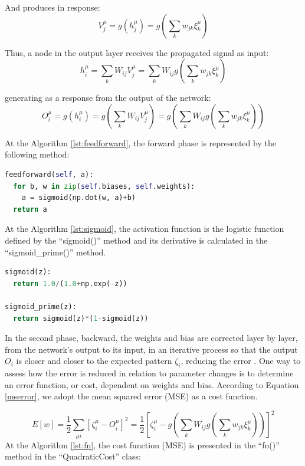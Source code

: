And produces in response:
\begin{equation}
\label{vequal}
V_j^\mu=g(h_j^\mu)=g(\sum_kw_{jk}\xi_k^\mu)
\end{equation}

Thus, a node in the output layer receives the propagated signal as input:
\begin{equation}
\label{sumsums}
h_i^\mu=\sum_kW_{ij}V_j^\mu=\sum_kW_{ij}g(\sum_kw_{jk}\xi_k^\mu)
\end{equation}

generating as a response from the output of the network:
\begin{equation}
\label{outeq}
O_i^\mu=g(h_i^\mu)=g(\sum_kW_{ij}V_j^\mu)=g(\sum_kW_{ij}g(\sum_kw_{jk}\xi_k^\mu))
\end{equation}

At the Algorithm \ref{lst:feedforward}, the forward phase is represented by the following method:

\begin{lstlisting}[caption={Delta method in Python},label={lst:feedforward},language=Python]
feedforward(self, a):
  for b, w in zip(self.biases, self.weights):
    a = sigmoid(np.dot(w, a)+b)
  return a
\end{lstlisting}

At the Algorithm \ref{lst:sigmoid}, the activation function is the logistic function defined by the “sigmoid()” method and its derivative is calculated in the “sigmoid\_prime()” method.

\begin{lstlisting}[caption={Delta method in Python},label={lst:sigmoid},language=Python]
sigmoid(z):
  return 1.0/(1.0+np.exp(-z))
 
sigmoid_prime(z):
  return sigmoid(z)*(1-sigmoid(z))
\end{lstlisting}

In the second phase, backward, the weights and bias are corrected layer by layer, from the network's output to its input, in an iterative process so that the output $O_i$ is closer and closer to the expected pattern $\zeta_i$, reducing the error \cite{haykin1999}. One way to assess how the error is reduced in relation to parameter changes is to determine an error function, or cost, dependent on weights and bias. According to Equation \ref{mserror}, we adopt the mean squared error (MSE) as a cost function.

\begin{equation}
\label{mserror}
E[w]=\frac{1}{2}\sum_{\mu i}[\zeta_i^\mu-O_i^\mu]^2 = \frac{1}{2}[\zeta_i^\mu - g(\sum_kW_{ij}g(\sum_kw_{jk}\xi_k^\mu))]^2
\end{equation}
At the Algorithm \ref{lst:fn}, the cost function (MSE) is presented in the “fn()” method in the “QuadraticCost” class:

